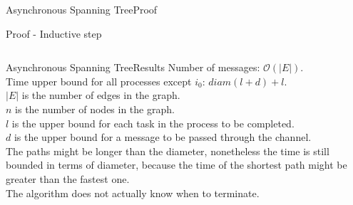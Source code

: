 \documentclass[pdf]{beamer}
\begin{document}
\begin{frame}[plain]{Asynchronous Spanning Tree}{Proof}
\begin{block}{Proof - Inductive step}
\begin{columns}
\begin{column}{.5\textwidth}
    \end{column}
    \end{columns}
    \end{block}
\end{frame}

\begin{frame}{Asynchronous Spanning Tree}{Results}
    Number of messages: $\mathcal{O}(|E|)$.\\
    Time upper bound for all processes except $i_0$: $diam(l+d)+l$.\\
    \vspace{6pt}
    $|E|$ is the number of edges in the graph.\\
    $n$ is the number of nodes in the graph.\\
    $l$ is the upper bound for each task in the process to be completed.\\
    $d$ is the upper bound for a message to be passed through the channel.\\
    \pause
    \vspace{6pt}
    The paths might be longer than the diameter, nonetheless the time is still bounded in 
    terms of diameter, because the time of the shortest path might be greater than the 
    fastest one.\\
    \pause
    \vspace{6pt}
    The algorithm does not actually know when to terminate.
\end{frame}
\end{document}
